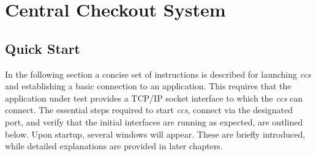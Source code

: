 \chapter{Central Checkout System}
\section{Quick Start}

In the following section a concise set of instructions is described for launching \textit{ccs} and establishing a basic connection to an application.
This requires that the application under test provides a TCP/IP socket interface to which the \textit{ccs} can connect.
The essential steps required to start \textit{ccs}, connect via the designated port, and verify that the initial interfaces are running as expected, are outlined below.
Upon startup, several windows will appear. These are briefly introduced, while detailed explanations are provided in later chapters.

